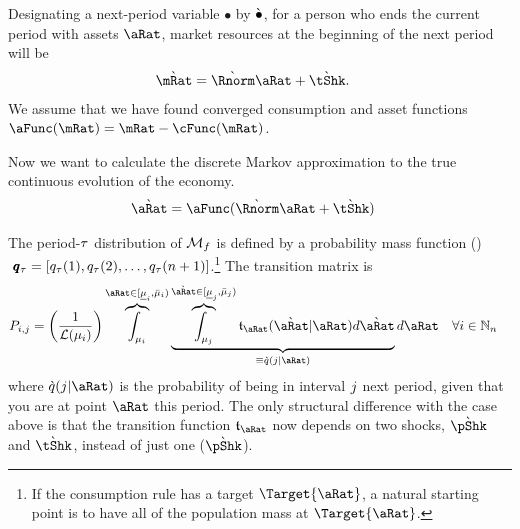 \documentclass[../BufferStockTheory.tex]{subfiles}\usepackage{ApndxSteadyState}
\begin{document}
  Designating a next-period variable $\bullet$ by $\Nxt{\bullet}$, for a person who ends the current period with assets $\point$, market resources at the beginning of the next period will be
  \begin{align}
    \Nxt{\mRat} & = \Nxt{\Rnorm}\point+\Nxt{\tShk}.
  \end{align}
  We assume that we have found converged consumption and asset functions $\aFunc(\mRat)=\mRat-\cFunc(\mRat)$.  
  
Now we want to calculate the discrete Markov approximation to the true continuous evolution of the economy. 
  \begin{align}
    \Nxt{\point} & = \aFunc(\Nxt{\Rnorm} \point + \Nxt{\tShk})
  \end{align}


  The period-$\tAbs$ distribution of $\Mrkv_{f}$ is defined by a probability mass function (\pmf)$~\vctr{\pDistDscr}_{\tAbs} = [\pDistDscr_{\tAbs}(1),\pDistDscr_{\tAbs}(2),\dots,\pDistDscr_{\tAbs}\StPls]$.\footnote{If the consumption rule has a target $\Target{\aRat}$, a natural starting point is to have all of the population mass at $\Target{\aRat}$.}  The transition matrix is 
  \begin{align}
    \PTrns_{\this,\that} &= \left(\frac{1}{\Lebes(\SetSub_{\this})}\right)\overbrace{\int_{\SetSub_{\this}}}^{\point\in[\Bot{\SetSub}_{\this},\Top{\SetSub}_{\this})}\underbrace{\overbrace{\int_{\SetSub_{\that}}}^{\Nxt{\point}\in[\Bot{\SetSub}_{\that},\Top{\SetSub}_{\that})}\trns_{\point}(\Nxt{\point}|\point){d\Nxt{\point}}}_{\equiv \Nxt{\pDistDscr}(\that|\point)} {d\point}~~~\forall\this\in\Nteger_{\StNum} \label{eq:thispTOthatp}
  \end{align}
  where $\Nxt{\pDistDscr}(\that|\point)$ is the probability of being in interval $\that$ next period, given that you are at point $\point$ this period.
  The only structural difference with the case above is that the transition function $\trns_{\point}$ now depends on two shocks, $\Nxt{\pShk}$ and $\Nxt{\tShk}$, instead of just one ($\Nxt{\pShk}$).

  \begin{comment}
    Equation \eqref{eq:stateDensity} translates to
    \begin{align}
      \pDens_{\tAbs+1}(\Nxt{\point}) &= \int_{\DistSetSprtFull} \trns_{\point}(\Nxt{\point}|\point)\pDens_{\tAbs}(\point)d\point ~~~~ \forall~\Nxt{\point} \in \DistSetSprtFull \label{eq:stateDensity}
    \end{align}
  \end{comment}
\end{document}
